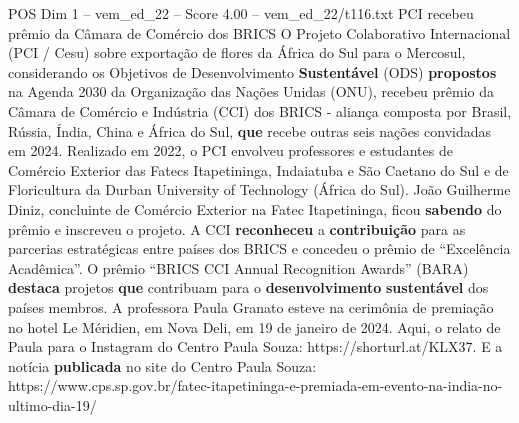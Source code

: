 \begin{textsample}{POS Dim 1 – vem\_ed\_22 – Score 4.00 – vem\_ed\_22/t116.txt}  \label{ex:f1_pos_174}
PCI recebeu prêmio da Câmara de Comércio dos BRICS O Projeto Colaborativo Internacional (PCI / Cesu) sobre exportação de flores da África do Sul para o Mercosul, considerando os Objetivos de Desenvolvimento \textbf{Sustentável} (ODS) \textbf{propostos} na Agenda 2030 da Organização das Nações Unidas (ONU), recebeu prêmio da Câmara de Comércio e Indústria (CCI) dos BRICS - aliança composta por Brasil, Rússia, Índia, China e África do Sul, \textbf{que} recebe outras seis nações convidadas em 2024.
Realizado em 2022, o PCI envolveu professores e estudantes de Comércio Exterior das Fatecs Itapetininga, Indaiatuba e São Caetano do Sul e de Floricultura da Durban University of Technology (África do Sul).
João Guilherme Diniz, concluinte de Comércio Exterior na Fatec Itapetininga, ficou \textbf{sabendo} do prêmio e inscreveu o projeto.
A CCI \textbf{reconheceu} a \textbf{contribuição} para as parcerias estratégicas entre países dos BRICS e concedeu o prêmio de “Excelência Acadêmica”.
O prêmio “BRICS CCI Annual Recognition Awards” (BARA) \textbf{destaca} projetos \textbf{que} contribuam para o \textbf{desenvolvimento} \textbf{sustentável} dos países membros.
A professora Paula Granato esteve na cerimônia de premiação no hotel Le Méridien, em Nova Deli, em 19 de janeiro de 2024.
Aqui, o relato de Paula para o Instagram do Centro Paula Souza: https://shorturl.at/KLX37.
E a notícia \textbf{publicada} no site do Centro Paula Souza: https://www.cps.sp.gov.br/fatec-itapetininga-e-premiada-em-evento-na-india-no-ultimo-dia-19/

\end{textsample}
